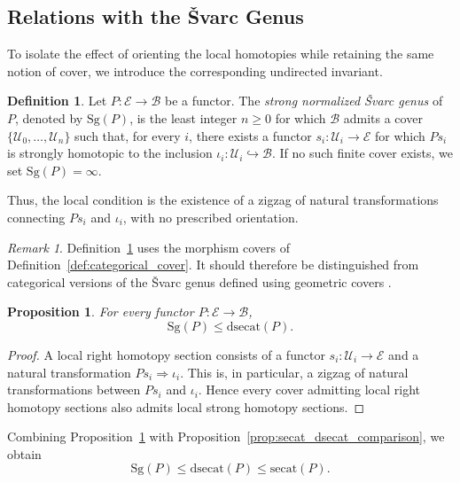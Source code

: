 \documentclass[12pt]{amsart}
\newtheorem{proposition}[teo]{Proposition}
\theoremstyle{definition}
\newtheorem{definition}[teo]{Definition}
\theoremstyle{remark}
\newtheorem{remark}{Remark}
\numberwithin{figure}{section}%
\newcommand{\Ba}{\mathcal{B}}
\newcommand{\E}{\mathcal{E}}
\newcommand{\Uc}{\mathcal{U}}
\begin{document}
\subsection{Relations with the \v{S}varc Genus}
\label{subsec:svarc_genus}

To isolate the effect of orienting the local homotopies while retaining the
same notion of cover, we introduce the corresponding undirected invariant.

\begin{definition}\label{def:strong_sectional_category}
Let \(P\colon\E\to\Ba\) be a functor. The \emph{strong normalized
\v{S}varc genus} of \(P\), denoted by \(\mathrm{Sg}(P)\), is the
least integer \(n\geq0\) for which \(\Ba\) admits a cover
\(\{\Uc_0,\ldots,\Uc_n\}\) such that, for every \(i\), there exists a
functor \(s_i\colon\Uc_i\to\E\) for which \(P s_i\) is strongly homotopic
to the inclusion \(\iota_i\colon\Uc_i\hookrightarrow\Ba\). If no such
finite cover exists, we set \(\mathrm{Sg}(P)=\infty\).
\end{definition}

Thus, the local condition is the existence of a zigzag of natural
transformations connecting \(P s_i\) and \(\iota_i\), with no prescribed
orientation.

\begin{remark}
Definition~\ref{def:strong_sectional_category} uses the morphism covers of
Definition~\ref{def:categorical_cover}. It should therefore be
distinguished from categorical versions of the \v{S}varc genus defined
using geometric covers
\cite{Baues-Isaac,carcaciacampos2026weakstrongfibrationsfunctors}.
\end{remark}

\begin{proposition}\label{prop:ssecat_leq_dsecat}
For every functor \(P\colon\E\to\Ba\),
\[
\mathrm{Sg}(P)
\leq
\mathrm{dsecat}(P).
\]
\end{proposition}

\begin{proof}
A local right homotopy section consists of a functor
\(s_i\colon\Uc_i\to\E\) and a natural transformation
\(P s_i\Rightarrow\iota_i\). This is, in particular, a zigzag of natural
transformations between \(P s_i\) and \(\iota_i\). Hence every cover
admitting local right homotopy sections also admits local strong homotopy
sections.
\end{proof}

Combining Proposition~\ref{prop:ssecat_leq_dsecat} with
Proposition~\ref{prop:secat_dsecat_comparison}, we obtain
\[
\mathrm{Sg}(P)
\leq
\mathrm{dsecat}(P)
\leq
\mathrm{secat}(P).
\]
\end{document}
